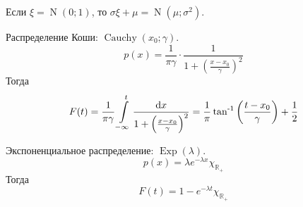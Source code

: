 \documentclass{article}
\begin{document}
    \begin{corollary}
        Если $\xi=\operatorname{N}(0;1)$, то $\sigma\xi+\mu=\operatorname{N}(\mu;\sigma^2)$.
    \end{corollary}
    \begin{example}
        Распределение Коши: $\operatorname{Cauchy}(x_0;\gamma)$.
        $$
        p(x)=\frac1{\pi\gamma}\cdot\frac1{1+\left(\frac{x-x_0}\gamma\right)^2}
        $$
        Тогда
        $$
        F(t)=\frac1{\pi\gamma}\int\limits_{-\infty}^t\frac{\mathrm dx}{1+\left(\frac{x-x_0}\gamma\right)^2}=\frac1\pi\operatorname{\tan^{-1}}\left(\frac{t-x_0}\gamma\right)+\frac12
        $$
    \end{example}
    \begin{example}
        Экспоненциальное распределение: $\operatorname{Exp}(\lambda)$.
        $$
        p(x)=\lambda e^{-\lambda x}\chi_{\mathbb R_+}
        $$
        Тогда
        $$
        F(t)=1-e^{-\lambda t}\chi_{\mathbb R_+}
        $$
    \end{example}
\end{document}
